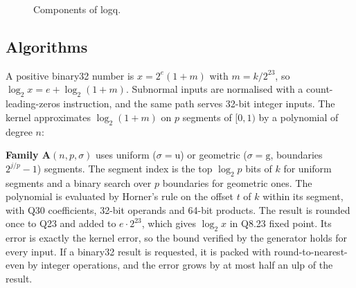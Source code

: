 \documentclass[preprint,12pt]{elsarticle}
\begin{document}
\begin{figure}[t]
\centering
{}
\caption{Components of logq.}
\label{fig:arch}
\end{figure}

\subsection{Algorithms}

A positive binary32 number is $x = 2^{e}(1+m)$ with $m = k/2^{23}$, so
$\log_2 x = e + \log_2(1+m)$. Subnormal inputs are normalised with a
count-leading-zeros instruction, and the same path serves 32-bit integer
inputs. The kernel approximates $\log_2(1+m)$ on $p$ segments of $[0,1)$ by a
polynomial of degree $n$:

\textbf{Family A$(n,p,\sigma)$} uses uniform ($\sigma=\mathrm{u}$) or
geometric ($\sigma=\mathrm{g}$, boundaries $2^{j/p}-1$) segments. The segment
index is the top $\log_2 p$ bits of $k$ for uniform segments and a binary
search over $p$ boundaries for geometric ones. The polynomial is
evaluated by Horner's rule on the offset $t$ of $k$ within its segment, with
Q30 coefficients, 32-bit operands and 64-bit products. The result is rounded
once to Q23 and added to $e\cdot2^{23}$, which gives $\log_2 x$ in Q8.23
fixed point. Its error is exactly the kernel error, so the bound verified by
the generator holds for every input. If a binary32 result is requested, it is
packed with round-to-nearest-even by integer operations, and the error grows
by at most half an ulp of the result.
\end{document}
